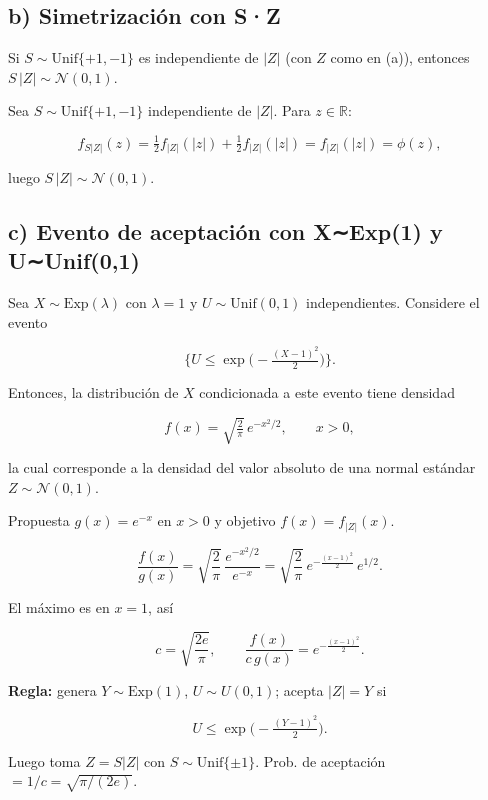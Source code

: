 \documentclass[10pt,a4paper]{article}
\let\le\leqslant
\let\leq\leqslant
\let\le\leq
\begin{document}
    \hypertarget{b-simetrizaciuxf3n-con-sz}{%
\subsection{b) Simetrización con
S·\textbar Z\textbar{}}\label{b-simetrizaciuxf3n-con-sz}}

    Si \(S \sim \text{Unif}\{+1,-1\}\) es independiente de \(|Z|\) (con
\(Z\) como en (a)), entonces \(S\,|Z| \sim \mathcal{N}(0,1)\).

    Sea \(S\sim\text{Unif}\{+1,-1\}\) independiente de \(|Z|\). Para
\(z\in\mathbb R\):

\[
f_{S|Z|}(z)=\tfrac12 f_{|Z|}(|z|)+\tfrac12 f_{|Z|}(|z|)=f_{|Z|}(|z|)=\phi(z),
\]

luego \(\boxed{S\,|Z|\sim \mathcal N(0,1)}\).

    \hypertarget{c-evento-de-aceptaciuxf3n-con-xexp1-y-uunif01}{%
\subsection{c) Evento de aceptación con X∼Exp(1) y
U∼Unif(0,1)}\label{c-evento-de-aceptaciuxf3n-con-xexp1-y-uunif01}}

    Sea \(X \sim \text{Exp}(\lambda)\) con \(\lambda = 1\) y
\(U \sim \text{Unif}(0,1)\) independientes. Considere el evento

\[
\big\{ U \le \exp\big(-\tfrac{(X-1)^{2}}{2}\big) \big\}.
\]

Entonces, la distribución de \(X\) condicionada a este evento tiene
densidad

\[
f(x) = \sqrt{\tfrac{2}{\pi}}\, e^{-x^{2}/2}, \qquad x > 0,
\]

la cual corresponde a la densidad del valor absoluto de una normal
estándar \(Z \sim \mathcal{N}(0,1)\).

    Propuesta \(g(x)=e^{-x}\) en \(x>0\) y objetivo \(f(x)=f_{|Z|}(x)\).

\[
\frac{f(x)}{g(x)}=\sqrt{\frac{2}{\pi}}\,\frac{e^{-x^2/2}}{e^{-x}}
=\sqrt{\frac{2}{\pi}}\,e^{-\frac{(x-1)^2}{2}}\,e^{1/2}.
\]

El máximo es en \(x=1\), así

\[
\boxed{c=\sqrt{\frac{2e}{\pi}}},\qquad
\frac{f(x)}{c\,g(x)}=e^{-\frac{(x-1)^2}{2}}.
\]

\textbf{Regla:} genera \(Y\sim\mathrm{Exp}(1)\), \(U\sim U(0,1)\);
acepta \(|Z|=Y\) si

\[
\boxed{U\le \exp\!\Big(-\tfrac{(Y-1)^2}{2}\Big)}.
\]

Luego toma \(Z=S|Z|\) con \(S\sim\text{Unif}\{\pm1\}\). Prob. de
aceptación \(=1/c=\boxed{\sqrt{\pi/(2e)}}\).
\end{document}
